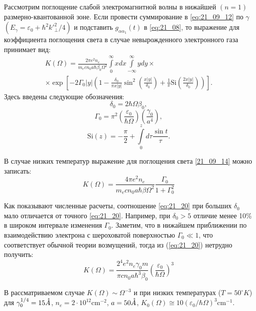 Рассмотрим поглощение слабой электромагнитной волны в нижайшей $(n=1)$ размерно-квантованной зоне. Если провести суммирование в \eqref{eq:21_09_12} по $\gamma$ $\left( E_{\gamma} = \varepsilon_0 + \hbar^2 {k'}_{\bot}^2 / {4} \right) $ и подставить $g_{\alpha\alpha_1 }(t)$ в \eqref{eq:21_08}, то выражение для коэффициента поглощения света в случае невырожденного электронного газа принимает вид:
\begin{multline} \label{21_09_14}
K(\Omega) = \frac{2 \pi e^2 n_e }{m_e c n_0 a \hbar \beta_0 \Omega^2} \int\limits_0^{\infty}x dx \int\limits_{-\infty}^{\infty}y dy \times \\
\times \exp{\left[ - 2\Gamma_0 |y| \left( 1 - \frac{\delta_0}{\pi x |y|}\sin^2{\left( \frac{x|y|}{\delta_0}\right) } + \frac{1}{\pi} \mathrm{Si}{\left( \frac{2x|y|}{\delta_0}\right) } \right)  \right]  }.
\end{multline} 
Здесь введены следующие обозначения:
\[
\delta_0 = 2\hbar \Omega \beta_0,
\]
\[
\Gamma_0 = \pi^2 \left(\frac{\varepsilon_0}{\hbar \Omega} \right) \left( \frac{\gamma_0}{a^4} \right),
\]
\[
\mathrm{Si}(z) = -\frac{\pi}{2} + \int\limits_0^z{d\tau\frac{\sin{t}}{\tau}}.
\]

В случае низких температур выражение для поглощения света \eqref{21_09_14} можно записать:
\begin{equation} \label{eq:21_20}
K(\Omega )=\frac{4\pi e^{2} n_{e} }{m_e c n_0 a \hbar\beta \Omega^2 } \frac{\Gamma_0 }{1+\Gamma_0^2 }
\end{equation} 

Как показывают численные расчеты, соотношение \ref{eq:21_20} при больших $\delta_0$ мало отличается от точного \ref{eq:21_20}. Например, при $\delta_0 > 5$ отличие менее 10\% в широком интервале изменения $\Gamma_0$. Заметим, что в нижайшем приближении по взаимодействию электрона с шероховатой поверхностью $\Gamma_0 \ll 1$, что соответствует обычной теории возмущений, тогда из (\ref{eq:21_20}) нетрудно получить:
\begin{equation} \label{eq:21_30}
K(\Omega )=\frac{2^4 e^2 n_e \gamma_0 m}{\pi c n_0 a\hbar^3 \beta_0 } \left(\frac{\varepsilon_0 }{\hbar\Omega } \right)^3
\end{equation} 

В рассматриваемом случае $K(\Omega )\sim \Omega^{-3} $ и при низких температурах ($T=50^{\circ } K$) для $\gamma_0^{1/4} =15 \AA$, $n_e = 2\cdot 10^{12} \text{cm}^{-2} $, $a=50 \AA$, $K_0 (\Omega )\cong 10\left(\varepsilon_0 / \hbar\Omega \right)^3 \text{cm}^{-1} $.

